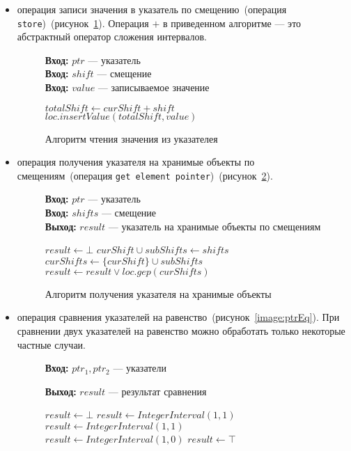 \begin{itemize}
\item операция записи значения в указатель по смещению~(операция 
\texttt{store})~(рисунок~\ref{image:ptrStore}). Операция $+$ в приведенном
алгоритме --- это абстрактный оператор сложения интервалов.
\begin{figure}[h!]
\textbf{Вход:} $ptr$ --- указатель\\
\textbf{Вход:} $shift$ --- смещение\\
\textbf{Вход:} $value$ --- записываемое значение

\begin{algorithmic}[1]
        \State $totalShift \gets curShift + shift$
        \State $loc.insertValue(totalShift, value)$
    \EndFor
\EndFor
\end{algorithmic}
\caption{Алгоритм чтения значения из указателея}
\label{image:ptrStore}
\end{figure}

\item операция получения указателя на хранимые объекты по смещениям~(операция 
\texttt{get element pointer})~(рисунок~\ref{image:ptrGep}).
\begin{figure}[h!]
\textbf{Вход:} $ptr$ --- указатель\\
\textbf{Вход:} $shifts$ --- смещение\\
\textbf{Выход:} $result$ --- указатель на хранимые объекты по смещениям

\begin{algorithmic}[1]
\State $result \gets \bot$
\State $curShift \cup subShifts \gets shifts$
        \State $curShifts \gets \{curShift\} \cup subShifts$
        \State $result \gets result \vee loc.gep(curShifts)$
    \EndFor
\EndFor
\end{algorithmic}
\caption{Алгоритм получения указателя на хранимые объекты}
\label{image:ptrGep}
\end{figure}

\item операция сравнения указателей на равенство~(рисунок~\ref{image:ptrEq}).
При сравнении двух указателей на равенство можно обработать только некоторые
частные случаи.
\begin{figure}[h!]
\textbf{Вход:} $ptr_1, ptr_2$ --- указатели

\textbf{Выход:} $result$ --- результат сравнения

\begin{algorithmic}[1]
\State $result \gets \bot$
    \State $result \gets IntegerInterval(1, 1)$
    \State $result \gets IntegerInterval(1, 1)$
    \State $result \gets IntegerInterval(1, 0)$
\Else
    \State $result \gets \top$
\EndIf


\end{algorithmic}
\end{figure}
\end{itemize}
